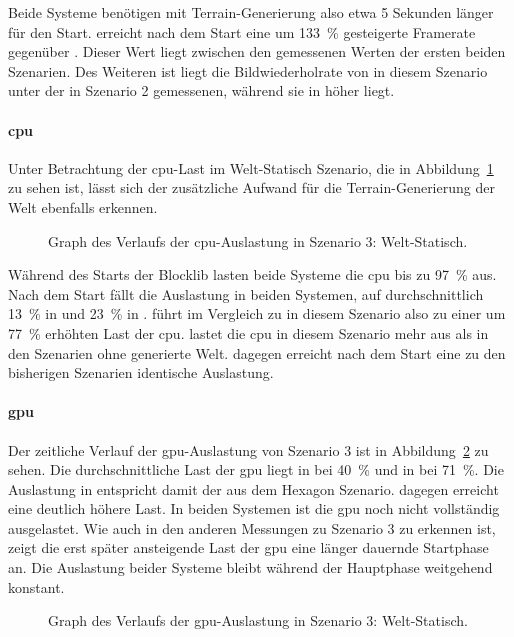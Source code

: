 Beide Systeme benötigen mit Terrain-Generierung also etwa 5 Sekunden länger für den Start. \sysB{} erreicht nach dem Start eine um \SI{133}{\percent} gesteigerte Framerate gegenüber \sysA{}. Dieser Wert liegt zwischen den gemessenen Werten der ersten beiden Szenarien. Des Weiteren ist liegt die Bildwiederholrate von \sysA{} in diesem Szenario unter der in Szenario 2 gemessenen, während sie in \sysB{} höher liegt.

\paragraph{\ac{cpu}}
Unter Betrachtung der \ac{cpu}-Last im Welt-Statisch Szenario, die in Abbildung~\ref{fig:seed-0-static-cpu} zu sehen ist, lässt sich der zusätzliche Aufwand für die Terrain-Generierung der Welt ebenfalls erkennen.
\begin{figure}[!htbp]
	\caption[Graph des Verlaufs der -Auslastung in Szenario 3: Welt-Statisch.]{Graph des Verlaufs der \ac{cpu}-Auslastung in Szenario 3: Welt-Statisch.}\label{fig:seed-0-static-cpu}
\end{figure}
Während des Starts der Blocklib lasten beide Systeme die \ac{cpu} bis zu \SI{97}{\percent} aus. Nach dem Start fällt die Auslastung in beiden Systemen, auf durchschnittlich \SI{13}{\percent} in \sysA{} und \SI{23}{\percent} in \sysB{}.
\sysB{} führt im Vergleich zu \sysA{} in diesem Szenario also zu einer um \SI{77}{\percent} erhöhten Last der \ac{cpu}. \sysB{} lastet die \ac{cpu} in diesem Szenario mehr aus als in den Szenarien ohne generierte Welt. \sysA{} dagegen erreicht nach dem Start eine zu den bisherigen Szenarien identische Auslastung.

\paragraph{\ac{gpu}}
Der zeitliche Verlauf der \ac{gpu}-Auslastung von Szenario 3 ist in Abbildung~\ref{fig:seed-0-static-gpu} zu sehen. Die durchschnittliche Last der \ac{gpu} liegt in \sysA{} bei \SI{40}{\percent} und in \sysB{} bei \SI{71}{\percent}. Die Auslastung in \sysA{} entspricht damit der aus dem Hexagon Szenario. \sysB{} dagegen erreicht eine deutlich höhere Last. In beiden Systemen ist die \ac{gpu} noch nicht vollständig ausgelastet. Wie auch in den anderen Messungen zu Szenario 3 zu erkennen ist, zeigt die erst später ansteigende Last der \ac{gpu} eine länger dauernde Startphase an. Die Auslastung beider Systeme bleibt während der Hauptphase weitgehend konstant.
\begin{figure}[!htbp]
	\caption[Graph des Verlaufs der -Auslastung in Szenario 3: Welt-Statisch.]{Graph des Verlaufs der \ac{gpu}-Auslastung in Szenario 3: Welt-Statisch.}\label{fig:seed-0-static-gpu}
\end{figure}

